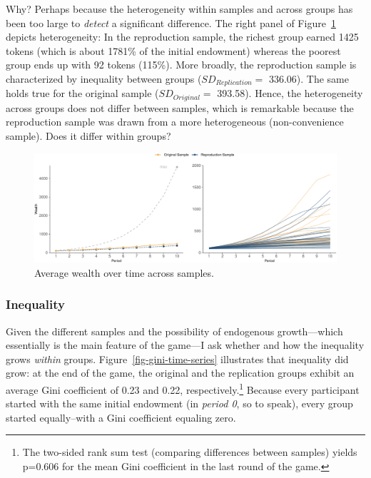 \documentclass[
  authoryear,
  review,
  3p,
  onecolumn]{elsarticle}
\begin{document}
Why? Perhaps because the heterogeneity within samples and across groups
has been too large to \emph{detect} a significant difference. The right
panel of Figure~\ref{fig-growth-heterogeneity} depicts heterogeneity: In
the reproduction sample, the richest group earned 1425 tokens (which is
about 1781\% of the initial endowment) whereas the poorest group ends up
with 92 tokens (115\%). More broadly, the reproduction sample is
characterized by inequality between groups (\(SD_{Replication} =\)
336.06). The same holds true for the original sample
(\(SD_{Original} =\) 393.58). Hence, the heterogeneity across groups
does not differ between samples, which is remarkable because the
reproduction sample was drawn from a more heterogeneous (non-convenience
sample). Does it differ within groups?

\begin{figure}

{\centering \includegraphics{paper_files/figure-pdf/fig-growth-heterogeneity-1.pdf}

}

\caption{\label{fig-growth-heterogeneity}Average wealth over time across
samples.}

\end{figure}

\hypertarget{sec-inequality}{%
\subsubsection{Inequality}\label{sec-inequality}}

Given the different samples and the possibility of endogenous
growth---which essentially is the main feature of the game---I ask
whether and how the inequality grows \emph{within} groups.
Figure~\ref{fig-gini-time-series} illustrates that inequality did grow:
at the end of the game, the original and the replication groups exhibit
an average Gini coefficient of 0.23 and 0.22, respectively.\footnote{The
  two-sided rank sum test (comparing differences between samples) yields
  p=0.606 for the mean Gini coefficient in the last round of the game.}
Because every participant started with the same initial endowment (in
\emph{period 0}, so to speak), every group started equally--with a Gini
coefficient equaling zero.
\end{document}
